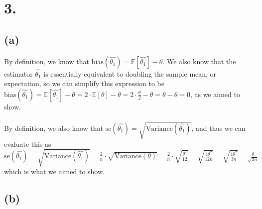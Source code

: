 \documentclass{article}
\begin{document}
\section*{3.}
{\Large

\subsection*{(a)}

By definition, we know that $\text{bias}(\hat{\theta_1}) = \mathbb{E}[\hat{\theta_1}] - \theta$. We also know that the estimator $\hat{\theta_1}$ is essentially equivalent to doubling the sample mean, or expectation, so we can simplify this expression to be \\
$\text{bias}(\hat{\theta_1}) = \mathbb{E}[\hat{\theta_1}] - \theta = 2 \cdot \mathbb{E}[\theta] - \theta = 2 \cdot \frac{\theta}{2} - \theta = \theta - \theta = 0$, as we aimed to show. \\ \\
By definition, we also know that $\text{se}(\hat{\theta_1}) = \sqrt{\text{Variance}(\hat{\theta_1})}$, and thus we can evaluate this as \\ 
$\text{se}(\hat{\theta_1}) 
= \sqrt{\text{Variance}(\hat{\theta_1})}
= \frac{2}{n} \cdot \sqrt{\text{Variance}(\theta)} 
= \frac{2}{n} \cdot \sqrt{\frac{\theta^2}{12}} 
= \sqrt{\frac{4\theta^2}{12n}}
= \sqrt{\frac{4\theta^2}{3n}} 
= \frac{\theta}{\sqrt{3n}}$ \\
which is what we aimed to show.

\subsection*{(b)}

}
\end{document}
